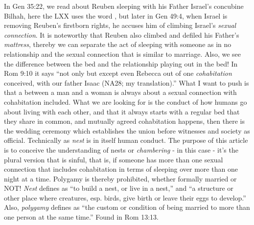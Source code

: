 In Gen 35:22, we read about Reuben sleeping with his Father Israel's concubine Bilhah, here the LXX uses the word , but later in Gen 49:4, when Israel is removing Reuben's firstborn rights, he accuses him of climbing Israel's  \emph{sexual connection}. It is noteworthy that Reuben also climbed and defiled his Father's  \emph{mattress}, thereby we can separate the act of sleeping with someone as in no relationship and the sexual connection that is similar to marriage. Also, we see the difference between the bed and the relationship playing out in the bed!
In Rom 9:10 it says ``not only but except even Rebecca out of one \emph{cohabitation} conceived, with our father Isaac (NA28; my translation).'' What I want to push is that a  between a man and a woman is always about a sexual connection with cohabitation included. What we are looking for is the conduct of how humans go about living with each other, and that it always starts with a regular bed that they share in common, and mutually agreed cohabitation happens, then there is the wedding ceremony which establishes the union before witnesses and society as official.
 Technically  as \emph{nest} is in itself human conduct. The purpose of this article is to conceive the understanding of nests or \emph{chambering} - in this case - it's the plural version that is sinful, that is, if someone has more than one sexual connection that includes cohabitation in terms of sleeping over more than one night at a time. Polygamy is thereby prohibited, whether formally married or NOT!
\emph{Nest} defines as ``to build a nest, or live in a nest,'' and ``a structure or other place where creatures, esp. birds, give birth or leave their eggs to develop.'' Also, \emph{polygamy} defines as ``the custom or condition of being married to more than one person at the same time.''
Found in Rom 13:13.
